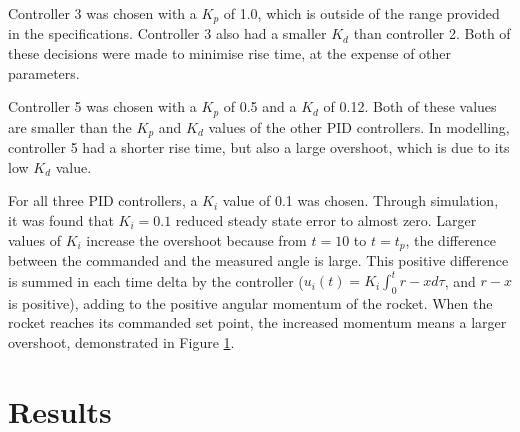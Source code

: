 \documentclass[12pt]{article}
\begin{document}
Controller 3 was chosen with a $K_p$ of 1.0, which is outside of the range provided in the specifications. Controller 3 also had a smaller $K_d$ than controller 2.
Both of these decisions were made to minimise rise time, at the expense of other parameters.

Controller 5 was chosen with a $K_p$ of 0.5 and a $K_d$ of 0.12. Both of these values are smaller than the $K_p$ and $K_d$ values of the other PID controllers. In modelling, controller 5 had a shorter rise time, but also a large overshoot, which is due to its low $K_d$ value.

For all three PID controllers, a $K_i$ value of 0.1 was chosen. Through simulation, it was found that $K_i = 0.1$ reduced steady state error to almost zero. Larger values of $K_i$ increase the overshoot because from $t=10$ to $t=t_p$, the difference between the commanded and the measured angle is large. This positive difference is summed in each time delta by the controller ($u_i(t) = K_i\int_{0}^{t}r-x d\tau$, and $r-x$ is positive), adding to the positive angular momentum of the rocket. When the rocket reaches its commanded set point, the increased momentum means a larger overshoot, demonstrated in Figure \ref{fig:pidcontroller}.

\begin{figure}[h]
    \centering
    \scalebox{0.55}{}
    \label{fig:pidcontroller}
\end{figure}

\section {Results}
\end{document}
